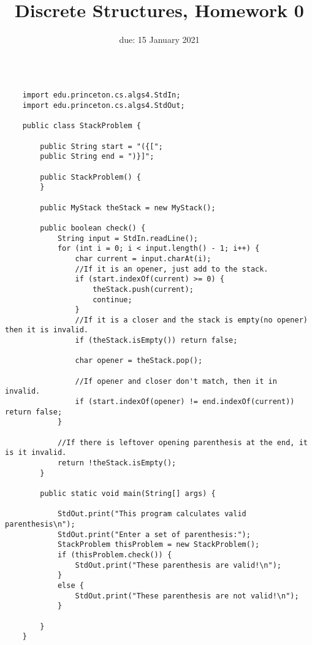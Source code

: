 \documentclass{article}
\title{Discrete Structures, Homework 0}
\author{\todo{Your Name Here}}
\date{due: 15 January 2021}
\begin{document}
\begin{verbatim}
    
    import edu.princeton.cs.algs4.StdIn;
    import edu.princeton.cs.algs4.StdOut;
    
    public class StackProblem {
    
        public String start = "({[";
        public String end = ")}]";
    
        public StackProblem() {
        }
    
        public MyStack theStack = new MyStack();
    
        public boolean check() {
            String input = StdIn.readLine();
            for (int i = 0; i < input.length() - 1; i++) {
                char current = input.charAt(i);
                //If it is an opener, just add to the stack.
                if (start.indexOf(current) >= 0) {
                    theStack.push(current);
                    continue;
                }
                //If it is a closer and the stack is empty(no opener) then it is invalid.
                if (theStack.isEmpty()) return false;
    
                char opener = theStack.pop();
    
                //If opener and closer don't match, then it in invalid.
                if (start.indexOf(opener) != end.indexOf(current)) return false;
            }
    
            //If there is leftover opening parenthesis at the end, it is it invalid.
            return !theStack.isEmpty();
        }
    
        public static void main(String[] args) {
    
            StdOut.print("This program calculates valid parenthesis\n");
            StdOut.print("Enter a set of parenthesis:");
            StackProblem thisProblem = new StackProblem();
            if (thisProblem.check()) {
                StdOut.print("These parenthesis are valid!\n");
            }
            else {
                StdOut.print("These parenthesis are not valid!\n");
            }
    
        }
    }
    \end{verbatim}
\end{document}
